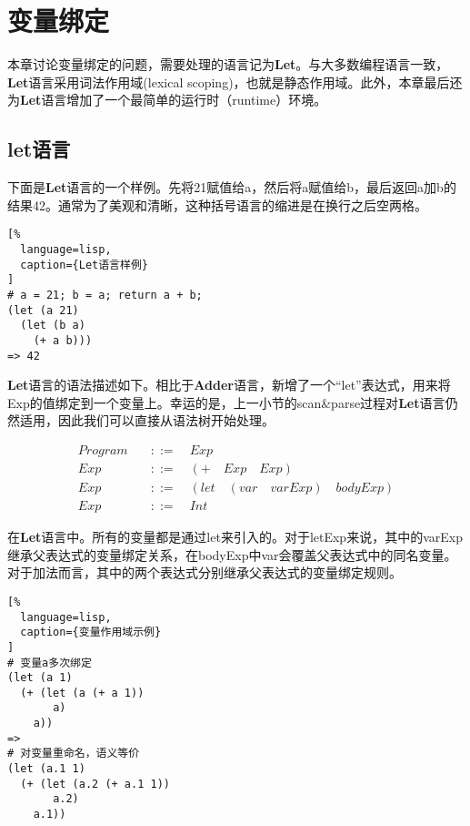 \chapter{变量绑定}

本章讨论变量绑定的问题，需要处理的语言记为\textbf{Let}。与大多数编程语言一致，\textbf{Let}语言采用词法作用域(lexical scoping)，也就是静态作用域。此外，本章最后还为\textbf{Let}语言增加了一个最简单的运行时（runtime）环境。

\section{let语言}

下面是\textbf{Let}语言的一个样例。先将21赋值给a，然后将a赋值给b，最后返回a加b的结果42。通常为了美观和清晰，这种括号语言的缩进是在换行之后空两格。

\begin{lstlisting}[%
  language=lisp,
  caption={Let语言样例}
]
# a = 21; b = a; return a + b;
(let (a 21)
  (let (b a)
    (+ a b)))
=> 42
\end{lstlisting}


\textbf{Let}语言的语法描述如下。相比于\textbf{Adder}语言，新增了一个“let”表达式，用来将Exp的值绑定到一个变量上。幸运的是，上一小节的scan\&parse过程对\textbf{Let}语言仍然适用，因此我们可以直接从语法树开始处理。

\begin{equation}
\begin{aligned}
  \label{eq:1}
   Program \quad &::= \quad Exp \\
   Exp \quad &::= \quad (+ \quad Exp \quad Exp) \\
   Exp \quad &::= \quad (let \quad (var \quad varExp) \quad bodyExp) \\
   Exp \quad &::=  \quad Int
\end{aligned}
\end{equation}

在\textbf{Let}语言中。所有的变量都是通过let来引入的。对于letExp来说，其中的varExp继承父表达式的变量绑定关系，在bodyExp中var会覆盖父表达式中的同名变量。对于加法而言，其中的两个表达式分别继承父表达式的变量绑定规则。

\begin{lstlisting}[%
  language=lisp,
  caption={变量作用域示例}
]
# 变量a多次绑定
(let (a 1)
  (+ (let (a (+ a 1))
       a)
	a))
=>
# 对变量重命名，语义等价
(let (a.1 1)
  (+ (let (a.2 (+ a.1 1))
       a.2)
	a.1))
\end{lstlisting}

